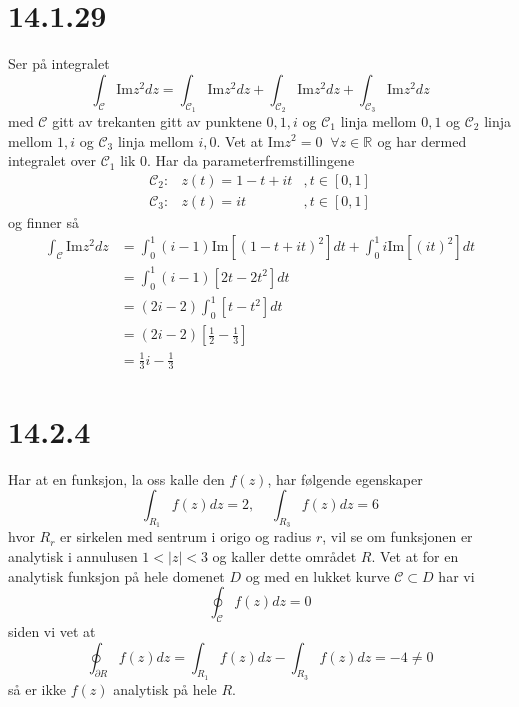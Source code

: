 \documentclass{report}
\newcommand{\M}[2]{\mathbb{#1}^{#2}}
\newcommand{\bbrack}[1]{\left[ #1 \right]}
\newcommand{\im}{\text{Im}}
\begin{document}
\section*{14.1.29}
Ser på integralet
\begin{equation}
  \label{eq:14}
  \int_{\mathcal{C}} \im z^{2} dz = \int_{\mathcal{C}_{1}} \im z^{2} dz + \int_{\mathcal{C}_{2}} \im z^{2} dz + \int_{\mathcal{C}_{3}} \im z^{2} dz
\end{equation}
med $\mathcal{C}$ gitt av trekanten gitt av punktene $0, 1, i$ og $\mathcal{C}_{1}$ linja mellom $0, 1$ og $\mathcal{C}_{2}$ linja mellom $1, i$ og $\mathcal{C}_{3}$ linja mellom $i, 0$. Vet at $\im z^{2} = 0 \;\; \forall z \in \M{R}{}$ og har dermed integralet over $\mathcal{C}_{1}$ lik 0. Har da parameterfremstillingene
\begin{equation}
  \label{eq:15}
  \begin{array}{lll}
    \mathcal{C}_{2} :& z(t) = 1 - t + it & , t\in \bbrack{0, 1} \\
    \mathcal{C}_{3} :& z(t) = it & , t\in \bbrack{0, 1}
  \end{array}
\end{equation}
og finner så
\begin{equation}
  \label{eq:16}
  \begin{split}
    \int_{\mathcal{C}} \im z^{2} dz &= \int_{0}^{1} (i-1) \im \bbrack{ (1 - t + it)^{2} } dt + \int_{0}^{1} i \im \bbrack{ (it)^{2} } dt \\
                                    &= \int_{0}^{1} (i-1) \bbrack{ 2t - 2t^{2} } dt \\
                                    &= (2i - 2) \int_{0}^{1} \bbrack{ t - t^{2}} dt \\
                                    &= (2i - 2) \bbrack{ \frac{1}{2} - \frac{1}{3} } \\
                                    &= \frac{1}{3}i - \frac{1}{3}
  \end{split}
\end{equation}


\section*{14.2.4}
Har at en funksjon, la oss kalle den $f(z)$, har følgende egenskaper
\begin{equation}
  \label{eq:17}
  \int_{R_{1}} f(z)dz = 2, \;\;\;\; \int_{R_{3}} f(z)dz = 6
\end{equation}
hvor $R_{r}$ er sirkelen med sentrum i origo og radius $r$, vil se om funksjonen er analytisk i annulusen $1 < |z| < 3$ og kaller dette området $R$. Vet at for en analytisk funksjon på hele domenet $D$ og med en lukket kurve $\mathcal C \subset D$ har vi
\begin{equation}
  \label{eq:18}
  \oint_{\mathcal{C}} f(z) dz = 0
\end{equation}
siden vi vet at
\begin{equation}
  \label{eq:19}
  \oint_{\partial R} f(z) dz = \int_{R_{1}} f(z) dz - \int_{R_{3}} f(z) dz = -4 \neq 0
\end{equation}
så er ikke $f(z)$ analytisk på hele $R$.
\end{document}

